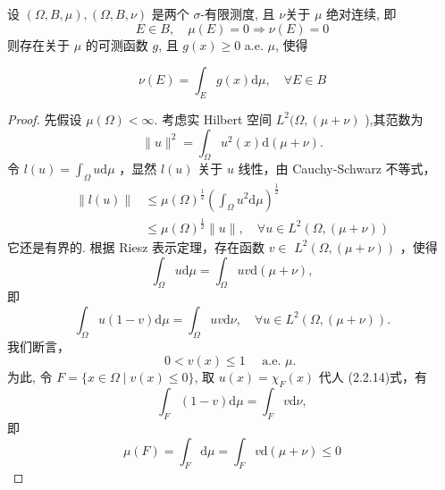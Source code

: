 \documentclass[lang=cn,newtx,10pt,scheme=chinese,thmcnt=chapter]{elegantbook}
\newcommand{\dif}{\mathrm{d}}
\begin{document}
\begin{theorem}
设 $(\Omega, B , \mu),(\Omega, B , \nu)$ 是两个 $\sigma$-有限测度, 且 $\nu$关于 $\mu$ 绝对连续, 即
\begin{equation*}
E \in B , \quad \mu(E)=0 \Rightarrow \nu(E)=0
\end{equation*}
则存在关于 $\mu$ 的可测函数 $g$, 且 $g(x) \geqslant 0$ a.e. $\mu$, 使得

\begin{equation*}
\nu(E)=\int_E g(x) \dif \mu, \quad \forall E \in B
\end{equation*}

\end{theorem}
\begin{proof}
先假设 $\mu(\Omega)<\infty$. 考虑实 Hilbert 空间 $L^2(\Omega,(\mu+\nu)$ ),其范数为
\begin{equation*}
\|u\|^2=\int_{\Omega} u^2(x) \dif(\mu+\nu) .
\end{equation*}
令 $l(u)=\int_{\Omega} u \dif \mu$ ，显然 $l(u)$ 关于 $u$ 线性，由 Cauchy-Schwarz 不等式，
\begin{equation*}
\begin{aligned}
\|l(u)\| & \leqslant \mu(\Omega)^{\frac{1}{2}}\left(\int_{\Omega} u^2 \dif \mu\right)^{\frac{1}{2}} \\
& \leqslant \mu(\Omega)^{\frac{1}{2}}\|u\|, \quad \forall u \in L^2(\Omega,(\mu+\nu))
\end{aligned}
\end{equation*}
它还是有界的. 根据 Riesz 表示定理，存在函数 $v \in$ $L^2(\Omega,(\mu+\nu))$ ，使得
\begin{equation*}
\int_{\Omega} u \dif \mu=\int_{\Omega} u v \dif(\mu+\nu),
\end{equation*}
即
\begin{equation*}
\int_{\Omega} u(1-v) \dif \mu=\int_{\Omega} u v \dif \nu, \quad \forall u \in L^2(\Omega,(\mu+\nu)) .
\end{equation*}
我们断言，
\begin{equation*}
0<v(x) \leqslant 1 \quad \text { a.e. } \mu \text {. }
\end{equation*}
为此, 令 $F=\{x \in \Omega \mid v(x) \leqslant 0\}$, 取 $u(x)=\chi_F(x)$ 代人 (2.2.14)式，有
\begin{equation*}
\int_F(1-v) \dif \mu=\int_F v \dif \nu,
\end{equation*}
即
\begin{equation*}
\mu(F)=\int_F \dif \mu=\int_F v \dif(\mu+\nu) \leqslant 0
\end{equation*}

\end{proof}
\end{document}
